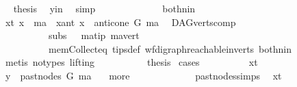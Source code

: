 \begin{isabellebody}
\ \isamarkupfalse%
\ {\isacharquery}{\kern0pt}thesis\ \isamarkupfalse%
\ y{\isacharunderscore}{\kern0pt}in\ \isamarkupfalse%
\ simp\ \isanewline
\ \ \ \ \isamarkupfalse%
\isanewline
\ \ \ \ \ \ \isamarkupfalse%
\ both{\isacharunderscore}{\kern0pt}nin\isanewline
\ \ \ \ \ \ \isamarkupfalse%
\ {\isacharparenleft}{\kern0pt}x{\isacharunderscore}{\kern0pt}t{\isacharparenright}{\kern0pt}\ {\isachardoublequoteopen}x\ {\isacharequal}{\kern0pt}\ ma{\isachardoublequoteclose}\ {\isacharbar}{\kern0pt}\ {\isacharparenleft}{\kern0pt}x{\isacharunderscore}{\kern0pt}ant{\isacharparenright}{\kern0pt}\ {\isachardoublequoteopen}x\ {\isasymin}\ anticone\ G\ ma{\isachardoublequoteclose}\ \isamarkupfalse%
\ DAG{\isachardot}{\kern0pt}verts{\isacharunderscore}{\kern0pt}comp{}\ \isanewline
\ \ \ \ \ \ \ \ \ \ subs{\isacharparenleft}{\kern0pt}{}{\isacharcomma}{\kern0pt}{}{\isacharparenright}{\kern0pt}\ {}\ \ ma{\isacharunderscore}{\kern0pt}tip\ ma{\isacharunderscore}{\kern0pt}vert\ \isanewline
\ \ \ \ \ \ \ \ \ \ mem{\isacharunderscore}{\kern0pt}Collect{\isacharunderscore}{\kern0pt}eq\ tips{\isacharunderscore}{\kern0pt}def\ wf{\isacharunderscore}{\kern0pt}digraph{\isachardot}{\kern0pt}reachable{}{\isacharunderscore}{\kern0pt}in{\isacharunderscore}{\kern0pt}verts{\isacharparenleft}{\kern0pt}{}{\isacharparenright}{\kern0pt}\ both{\isacharunderscore}{\kern0pt}nin\isanewline
\ \ \ \ \ \ \ \ \isamarkupfalse%
\ {\isacharparenleft}{\kern0pt}metis\ {\isacharparenleft}{\kern0pt}no{\isacharunderscore}{\kern0pt}types{\isacharcomma}{\kern0pt}\ lifting{\isacharparenright}{\kern0pt}{\isacharparenright}{\kern0pt}\ \isanewline
\ \ \ \ \ \ \isamarkupfalse%
\ \isamarkupfalse%
\ {\isacharquery}{\kern0pt}thesis\ \isamarkupfalse%
{\isacharparenleft}{\kern0pt}cases{\isacharparenright}{\kern0pt}\isanewline
\ \ \ \ \ \ \ \ \isamarkupfalse%
\ x{\isacharunderscore}{\kern0pt}t\ \isanewline
\ \ \ \ \ \ \ \ \isamarkupfalse%
\ {\isachardoublequoteopen}y\ {\isasymin}\ past{\isacharunderscore}{\kern0pt}nodes\ G\ ma{\isachardoublequoteclose}\ \isamarkupfalse%
\ {}{\isacharparenleft}{\kern0pt}{}{\isacharparenright}{\kern0pt}\ more\ \isanewline
\ \ \ \ \ \ \ \ \ \ \ \ past{\isacharunderscore}{\kern0pt}nodes{\isachardot}{\kern0pt}simps\ \isamarkupfalse%
\ x{\isacharunderscore}{\kern0pt}t\isanewline

\end{isabellebody}
